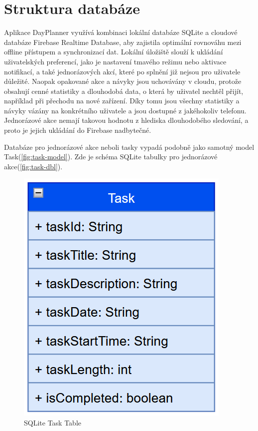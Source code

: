 \newpage

\section{Struktura databáze}
\hspace{14pt} Aplikace DayPlanner využívá kombinaci lokální databáze SQLite a cloudové databáze Firebase Realtime Database, aby zajistila optimální rovnováhu mezi offline přístupem a synchronizací dat. Lokální úložiště slouží k ukládání uživatelských preferencí, jako je nastavení tmavého režimu nebo aktivace notifikací, a také jednorázových akcí, které po splnění již nejsou pro uživatele důležité. Naopak opakované akce a návyky jsou uchovávány v cloudu, protože obsahují cenné statistiky a dlouhodobá data, o která by uživatel nechtěl přijít, například při přechodu na nové zařízení. Díky tomu jsou všechny statistiky a návyky vázány na konkrétního uživatele a jsou dostupné z jakéhokoliv telefonu. Jednorázové akce nemají takovou hodnotu z hlediska dlouhodobého sledování, a proto je jejich ukládání do Firebase nadbytečné.

Databáze pro jednorázové akce neboli tasky vypadá podobně jako samotný model Task(\autoref{fig:task-model}). Zde je schéma SQLite tabulky pro jednorázové akce(\autoref{fig:task-dbl}). 

\begin{figure}[H]
    \centering
    \includegraphics[width=0.5\linewidth]{images/task.png}
    \caption{SQLite Task Table}
    \label{fig:task-dbl}
\end{figure}

